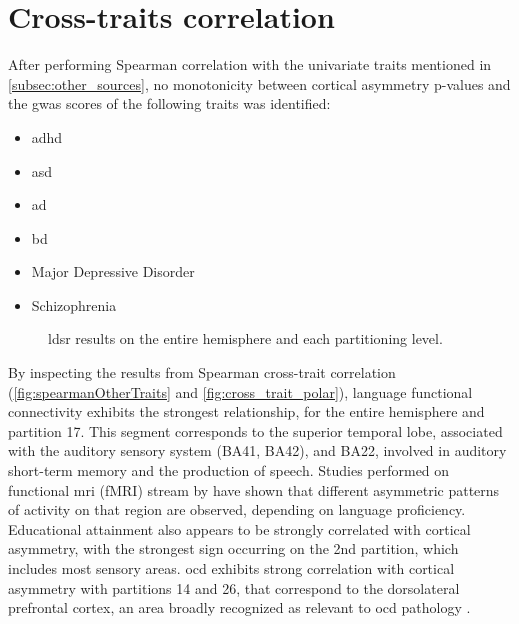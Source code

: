 \section{Cross-traits correlation}
\label{sec:ct-res}
After performing Spearman correlation with the univariate traits mentioned in \autoref{subsec:other_sources}, no monotonicity between cortical asymmetry p-values and the \ac{gwas} scores of the following traits was identified:
\begin{itemize}
	\item{\Acf{adhd}}
	\item{\Acf{asd}}
	\item{\Acf{ad}}
	\item{\Acf{bd}}
	\item{Major Depressive Disorder}
	\item{Schizophrenia}
\end{itemize}

\begin{figure}[H]
	\centering
	\quad
	\caption[LDSR results across partitioning levels]{\Ac{ldsr} results on the entire hemisphere and each partitioning level.}
	\label{fig:ldsr}
\end{figure}


By inspecting the results from Spearman cross-trait correlation (\autoref{fig:spearmanOtherTraits} and \ref{fig:cross_trait_polar}), language functional connectivity exhibits the strongest relationship, for the entire hemisphere and partition 17. This segment corresponds to the superior temporal lobe, associated with the auditory sensory system (BA41, BA42), and BA22, involved in auditory short-term memory and the production of speech. Studies performed on functional \ac{mri} (fMRI) stream by \citet{Hesling2012} have shown that different asymmetric patterns of activity on that region are observed, depending on language proficiency. Educational attainment also appears to be strongly correlated with cortical asymmetry, with the strongest sign occurring on the 2nd partition, which includes most sensory areas. \Ac{ocd} exhibits strong correlation with cortical asymmetry with partitions 14 and 26,  that correspond to the dorsolateral prefrontal cortex, an area broadly recognized as relevant to \ac{ocd} pathology \cite{Li2020,Han2016}. 

